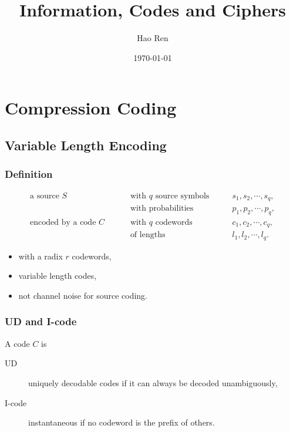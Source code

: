 \documentclass{article}
\begin{document}
\title{Information, Codes and Ciphers}
\author{Hao Ren}
\date{\today}
\maketitle

\newpage

\tableofcontents

\newpage

\setcounter{section}{2}

\section{Compression Coding}

\subsection{Variable Length Encoding}

\subsubsection{Definition}

\begin{align*}
	\text{a source } S \qquad &\text{ with } q \text{ source symbols} \qquad & s_{1},s_{2},\cdots,s_{q},\\
	&\text{ with probabilities} \qquad &  p_{1},p_{2},\cdots,p_{q},\\
	\text{encoded by a code } C \qquad &\text{ with } q \text{ codewords} \qquad & c_{1},c_{2},\cdots,c_{q},\\
	&\text{ of lengths} \qquad & l_{1},l_{2},\cdots,l_{q}.
\end{align*}

\begin{itemize}
	\item with a radix $r$ codewords,
	\item variable length codes,
	\item not channel noise for source coding.
\end{itemize}

\subsubsection{UD and I-code}

A code $C$ is

\begin{description}
	\item[UD] uniquely decodable codes if it can always be decoded unambiguously,
	\item[I-code] instantaneous if no codeword is the prefix of others.
\end{description}
\end{document}
